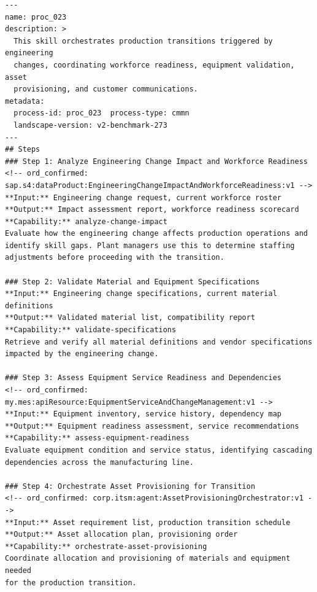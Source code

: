 \begin{lstlisting}[float=!t, floatplacement=!t, basicstyle=\ttfamily\scriptsize, breaklines=true, frame=single, label={lst:skill-example}, caption={Representative SKILL.md artefact (\texttt{proc\_023}, CMMN, first 4 of 8 steps). GT-eligible steps carry an \texttt{ord\_confirmed} comment pinning the verified ordId; non-GT steps do not.}]
---
name: proc_023
description: >
  This skill orchestrates production transitions triggered by engineering
  changes, coordinating workforce readiness, equipment validation, asset
  provisioning, and customer communications.
metadata:
  process-id: proc_023  process-type: cmmn
  landscape-version: v2-benchmark-273
---
## Steps
### Step 1: Analyze Engineering Change Impact and Workforce Readiness
<!-- ord_confirmed: sap.s4:dataProduct:EngineeringChangeImpactAndWorkforceReadiness:v1 -->
**Input:** Engineering change request, current workforce roster
**Output:** Impact assessment report, workforce readiness scorecard
**Capability:** analyze-change-impact
Evaluate how the engineering change affects production operations and
identify skill gaps. Plant managers use this to determine staffing
adjustments before proceeding with the transition.

### Step 2: Validate Material and Equipment Specifications
**Input:** Engineering change specifications, current material definitions
**Output:** Validated material list, compatibility report
**Capability:** validate-specifications
Retrieve and verify all material definitions and vendor specifications
impacted by the engineering change.

### Step 3: Assess Equipment Service Readiness and Dependencies
<!-- ord_confirmed: my.mes:apiResource:EquipmentServiceAndChangeManagement:v1 -->
**Input:** Equipment inventory, service history, dependency map
**Output:** Equipment readiness assessment, service recommendations
**Capability:** assess-equipment-readiness
Evaluate equipment condition and service status, identifying cascading
dependencies across the manufacturing line.

### Step 4: Orchestrate Asset Provisioning for Transition
<!-- ord_confirmed: corp.itsm:agent:AssetProvisioningOrchestrator:v1 -->
**Input:** Asset requirement list, production transition schedule
**Output:** Asset allocation plan, provisioning order
**Capability:** orchestrate-asset-provisioning
Coordinate allocation and provisioning of materials and equipment needed
for the production transition.
\end{lstlisting}

